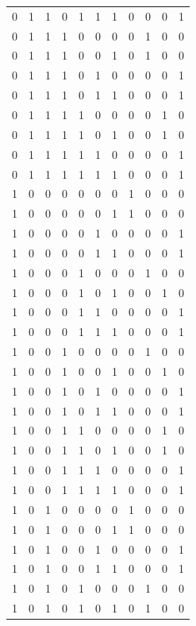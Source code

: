 \begin{longtable}{|c|c|c|c|c|c|c|c|c|c|c|}
0 & 1 & 1 & 0 & 1 & 1 & 1 &  0 & 0 & 0 & 1 \\
0 & 1 & 1 & 1 & 0 & 0 & 0 &  0 & 1 & 0 & 0 \\
0 & 1 & 1 & 1 & 0 & 0 & 1 &  0 & 1 & 0 & 0 \\
0 & 1 & 1 & 1 & 0 & 1 & 0 &  0 & 0 & 0 & 1 \\
0 & 1 & 1 & 1 & 0 & 1 & 1 &  0 & 0 & 0 & 1 \\
0 & 1 & 1 & 1 & 1 & 0 & 0 &  0 & 0 & 1 & 0 \\
0 & 1 & 1 & 1 & 1 & 0 & 1 &  0 & 0 & 1 & 0 \\
0 & 1 & 1 & 1 & 1 & 1 & 0 &  0 & 0 & 0 & 1 \\
0 & 1 & 1 & 1 & 1 & 1 & 1 &  0 & 0 & 0 & 1 \\
1 & 0 & 0 & 0 & 0 & 0 & 0 &  1 & 0 & 0 & 0 \\
1 & 0 & 0 & 0 & 0 & 0 & 1 &  1 & 0 & 0 & 0 \\
1 & 0 & 0 & 0 & 0 & 1 & 0 &  0 & 0 & 0 & 1 \\
1 & 0 & 0 & 0 & 0 & 1 & 1 &  0 & 0 & 0 & 1 \\
1 & 0 & 0 & 0 & 1 & 0 & 0 &  0 & 1 & 0 & 0 \\
1 & 0 & 0 & 0 & 1 & 0 & 1 &  0 & 0 & 1 & 0 \\
1 & 0 & 0 & 0 & 1 & 1 & 0 &  0 & 0 & 0 & 1 \\
1 & 0 & 0 & 0 & 1 & 1 & 1 &  0 & 0 & 0 & 1 \\
1 & 0 & 0 & 1 & 0 & 0 & 0 &  0 & 1 & 0 & 0 \\
1 & 0 & 0 & 1 & 0 & 0 & 1 &  0 & 0 & 1 & 0 \\
1 & 0 & 0 & 1 & 0 & 1 & 0 &  0 & 0 & 0 & 1 \\
1 & 0 & 0 & 1 & 0 & 1 & 1 &  0 & 0 & 0 & 1 \\
1 & 0 & 0 & 1 & 1 & 0 & 0 &  0 & 0 & 1 & 0 \\
1 & 0 & 0 & 1 & 1 & 0 & 1 &  0 & 0 & 1 & 0 \\
1 & 0 & 0 & 1 & 1 & 1 & 0 &  0 & 0 & 0 & 1 \\
1 & 0 & 0 & 1 & 1 & 1 & 1 &  0 & 0 & 0 & 1 \\
1 & 0 & 1 & 0 & 0 & 0 & 0 &  1 & 0 & 0 & 0 \\
1 & 0 & 1 & 0 & 0 & 0 & 1 &  1 & 0 & 0 & 0 \\
1 & 0 & 1 & 0 & 0 & 1 & 0 &  0 & 0 & 0 & 1 \\
1 & 0 & 1 & 0 & 0 & 1 & 1 &  0 & 0 & 0 & 1 \\
1 & 0 & 1 & 0 & 1 & 0 & 0 &  0 & 1 & 0 & 0 \\
1 & 0 & 1 & 0 & 1 & 0 & 1 &  0 & 1 & 0 & 0 \\

\end{longtable}
